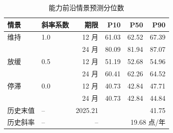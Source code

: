 \begin{table}[H]
  \centering
  \caption{能力前沿情景预测分位数}
  \label{tab:q4_frontier}
  \small
  \begin{tabular}{llrrrr}
    \toprule
    情景 & 斜率系数 & 期限 & P10 & P50 & P90 \\
    \midrule
    维持 & 1.0 & 12 月 & 61.03 & 62.52 & 67.39 \\
     &  & 24 月 & 80.09 & 81.94 & 87.07 \\
    \addlinespace[2pt]
    放缓 & 0.5 & 12 月 & 51.19 & 52.68 & 54.96 \\
     &  & 24 月 & 60.41 & 62.26 & 64.52 \\
    \addlinespace[2pt]
    停滞 & 0.0 & 12 月 & 40.73 & 42.84 & 47.71 \\
     &  & 24 月 & 40.73 & 42.84 & 44.84 \\
    \addlinespace[2pt]
    \midrule
    历史末值 & -- & 2025.21 & \multicolumn{3}{r}{41.75} \\
    历史斜率 & -- & -- & \multicolumn{3}{r}{19.68 点/年} \\
    \bottomrule
  \end{tabular}
\end{table}
